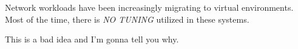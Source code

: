 Network workloads have been increasingly migrating to virtual environments.
Most of the time, there is \emph{NO TUNING} utilized in these systems.  

This is a bad idea and I'm gonna tell you why.  
